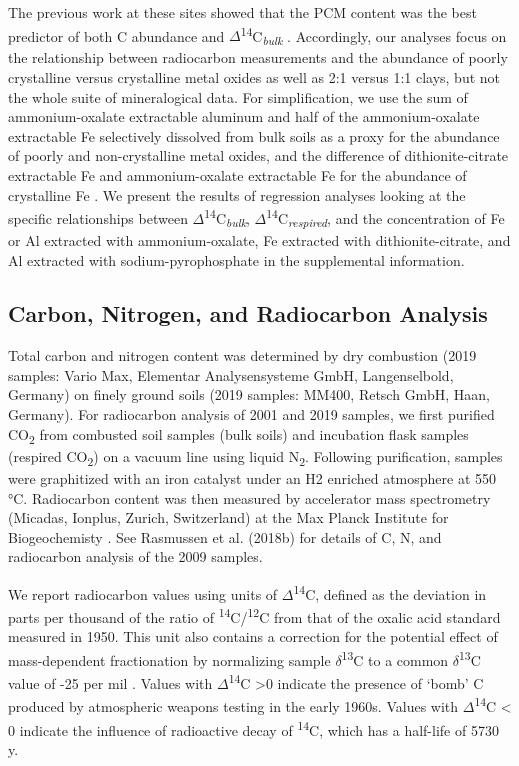 \documentclass[soil, manuscript]{copernicus}
\begin{document}
The previous work at these sites showed that the PCM content was the
best predictor of both C abundance and
\(\Delta\)\textsuperscript{14}C\textsubscript{\emph{bulk}}
\citep{rasmussen2018b}. Accordingly, our analyses focus on the
relationship between radiocarbon measurements and the abundance of
poorly crystalline versus crystalline metal oxides as well as 2:1 versus
1:1 clays, but not the whole suite of mineralogical data. For
simplification, we use the sum of ammonium-oxalate extractable aluminum
and half of the ammonium-oxalate extractable Fe selectively dissolved
from bulk soils as a proxy for the abundance of poorly and
non-crystalline metal oxides, and the difference of dithionite-citrate
extractable Fe and ammonium-oxalate extractable Fe for the abundance of
crystalline Fe \citep{kleber2005}. We present the results of regression
analyses looking at the specific relationships between
\(\Delta\)\textsuperscript{14}C\textsubscript{\emph{bulk}},
\(\Delta\)\textsuperscript{14}C\textsubscript{\emph{respired}}, and the
concentration of Fe or Al extracted with ammonium-oxalate, Fe extracted
with dithionite-citrate, and Al extracted with sodium-pyrophosphate in
the supplemental information.

\subsection{Carbon, Nitrogen, and Radiocarbon Analysis}

Total carbon and nitrogen content was determined by dry combustion (2019
samples: Vario Max, Elementar Analysensysteme GmbH, Langenselbold,
Germany) on finely ground soils (2019 samples: MM400, Retsch GmbH, Haan,
Germany). For radiocarbon analysis of 2001 and 2019 samples, we first
purified CO\textsubscript{2} from combusted soil samples (bulk soils)
and incubation flask samples (respired CO\textsubscript{2}) on a vacuum
line using liquid N\textsubscript{2}. Following purification, samples
were graphitized with an iron catalyst under an H2 enriched atmosphere
at 550 °C. Radiocarbon content was then measured by accelerator mass
spectrometry (Micadas, Ionplus, Zurich, Switzerland) at the Max Planck
Institute for Biogeochemisty \citep{steinhof2017}. See Rasmussen et al.
(2018b) for details of C, N, and radiocarbon analysis of the 2009
samples.

We report radiocarbon values using units of
\(\Delta\)\textsuperscript{14}C, defined as the deviation in parts per
thousand of the ratio of \textsuperscript{14}C/\textsuperscript{12}C
from that of the oxalic acid standard measured in 1950. This unit also
contains a correction for the potential effect of mass-dependent
fractionation by normalizing sample \(\delta\)\textsuperscript{13}C to a
common \(\delta\)\textsuperscript{13}C value of -25 per mil
\citep{stuiver1977}. Values with \(\Delta\)\textsuperscript{14}C
\textgreater{}0 indicate the presence of `bomb' C produced by
atmospheric weapons testing in the early 1960s. Values with
\(\Delta\)\textsuperscript{14}C \textless{} 0 indicate the influence of
radioactive decay of \textsuperscript{14}C, which has a half-life of
5730 y.
\end{document}

